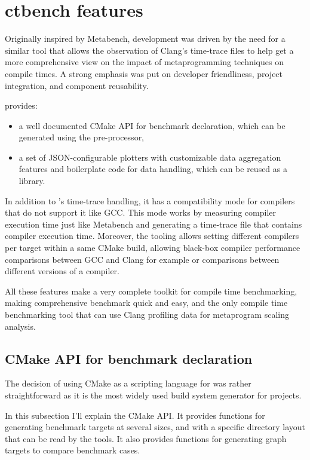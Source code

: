 \documentclass[../main]{subfiles}
\begin{document}
\section{ctbench features}

Originally inspired by Metabench\cite{metabench}, \ctbench development was
driven by the need for a similar tool that allows the observation of Clang's
time-trace files to help get a more comprehensive view on the impact of
metaprogramming techniques on compile times. A strong emphasis was put on
developer friendliness, project integration, and component reusability.

\ctbench provides:

\begin{itemize}
\item a well documented CMake API for benchmark declaration, which can be
      generated using the \cpp pre-processor,
\item a set of JSON-configurable plotters with customizable data aggregation
      features and boilerplate code for data handling, which can be reused as a
      \cpp library.
\end{itemize}

In addition to \ctbench's time-trace handling, it has a compatibility mode
for compilers that do not support it like GCC. This mode works by measuring
compiler execution time just like Metabench\cite{metabench} and generating a
time-trace file that contains compiler execution time. Moreover, the tooling
allows setting different compilers per target within a same CMake build,
allowing black-box compiler performance comparisons between GCC and Clang for
example or comparisons between different versions of a compiler.

All these features make \ctbench a very complete toolkit for compile time
benchmarking, making comprehensive benchmark quick and easy, and the only
compile time benchmarking tool that can use Clang profiling data for metaprogram
scaling analysis.

\subsection{CMake API for benchmark declaration}
\label{lbl:ctbench-cmake-api}

The decision of using CMake as a scripting language for \ctbench was rather
straightforward as it is the most widely used build system generator for \cpp
projects.

In this subsection I'll explain the CMake API. It provides functions for
generating benchmark targets at several sizes, and with a specific directory
layout that can be read by the \grapher tools. It also provides functions for
generating graph targets to compare benchmark cases.
\end{document}
